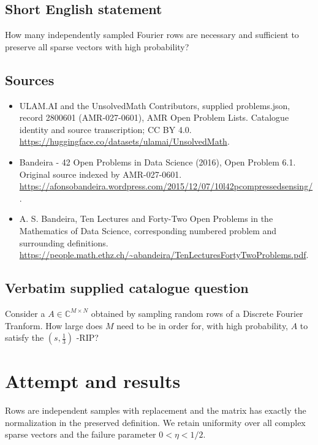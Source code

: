 \documentclass[11pt]{article}
\begin{document}
\subsection{Short English statement}
How many independently sampled Fourier rows are necessary and sufficient to preserve all sparse vectors with high probability?
\subsection{Sources}
\begin{itemize}
\item[S1] ULAM.AI and the UnsolvedMath Contributors, supplied problems.json, record 2800601 (AMR-027-0601), AMR Open Problem Lists. Catalogue identity and source transcription; CC BY 4.0.
\url{https://huggingface.co/datasets/ulamai/UnsolvedMath}.
\item[S2] Bandeira - 42 Open Problems in Data Science (2016), Open Problem 6.1. Original source indexed by AMR-027-0601.
\url{https://afonsobandeira.wordpress.com/2015/12/07/10l42pcompressedsensing/}.
\item[S3] A. S. Bandeira, Ten Lectures and Forty-Two Open Problems in the Mathematics of Data Science, corresponding numbered problem and surrounding definitions.
\url{https://people.math.ethz.ch/~abandeira/TenLecturesFortyTwoProblems.pdf}.
\end{itemize}
\subsection{Verbatim supplied catalogue question}
Consider a $A\in\mathbb{C}^{M\times N}$ obtained by sampling random rows of a Discrete Fourier Tranform. How large does $M$ need to be in order for, with high probability, $A$ to satisfy the $(s,\frac13)$ -RIP?

\section{Attempt and results}
Rows are independent samples with replacement and the matrix has exactly the
normalization in the preserved definition. We retain uniformity over all
complex sparse vectors and the failure parameter $0<\eta<1/2$.
\end{document}
